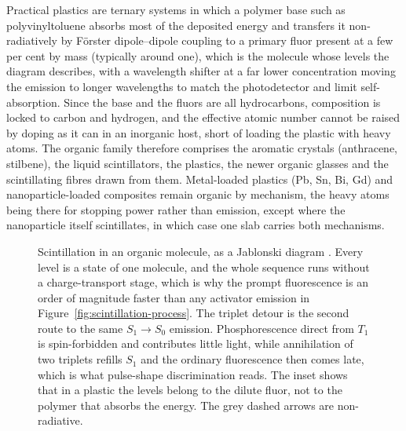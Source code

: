 Practical plastics are ternary systems in which a polymer base such as polyvinyltoluene absorbs most of the deposited energy and transfers it non-radiatively by F\"orster dipole--dipole coupling to a primary fluor present at a few per cent by mass (typically around one), which is the molecule whose levels the diagram describes, with a wavelength shifter at a far lower concentration moving the emission to longer wavelengths to match the photodetector and limit self-absorption.
Since the base and the fluors are all hydrocarbons, composition is locked to carbon and hydrogen, and the effective atomic number cannot be raised by doping as it can in an inorganic host, short of loading the plastic with heavy atoms.
The organic family therefore comprises the aromatic crystals (anthracene, stilbene), the liquid scintillators, the plastics, the newer organic glasses and the scintillating fibres drawn from them.
Metal-loaded plastics (Pb, Sn, Bi, Gd) and nanoparticle-loaded composites remain organic by mechanism, the heavy atoms being there for stopping power rather than emission, except where the nanoparticle itself scintillates, in which case one slab carries both mechanisms.

\begin{figure}[tbp]
	\centering
	
	\caption[Organic scintillation: the molecular energy levels]{%
		Scintillation in an organic molecule, as a Jablonski diagram \cite{Knoll2010}.
		Every level is a state of one molecule, and the whole sequence runs without a charge-transport stage, which is why the prompt fluorescence is an order of magnitude faster than any activator emission in Figure~\ref{fig:scintillation-process}.
		The triplet detour is the second route to the same $S_1 \rightarrow S_0$ emission.
Phosphorescence direct from $T_1$ is spin-forbidden and contributes little light, while annihilation of two triplets refills $S_1$ and the ordinary fluorescence then comes late, which is what pulse-shape discrimination reads.
		The inset shows that in a plastic the levels belong to the dilute fluor, not to the polymer that absorbs the energy.
		The grey dashed arrows are non-radiative.
	}
	\label{fig:organic-scintillation}
\end{figure}

\clearpage

